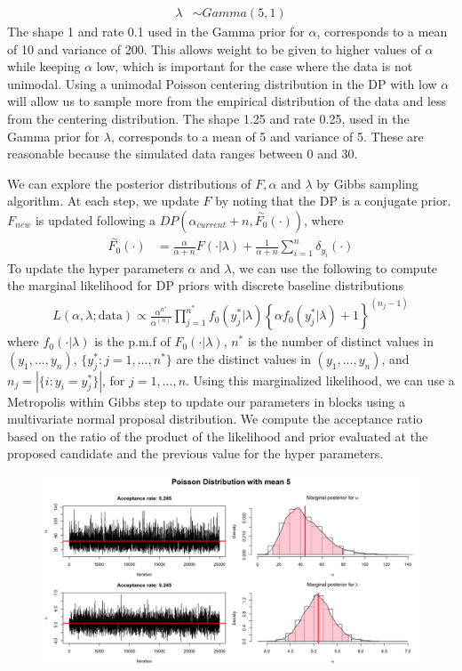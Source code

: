 \documentclass[a4paper, 10pt]{article}
\begin{document}
\begin{enumerate}
\begin{align*}
        \lambda &\sim Gamma(5, 1)
    \end{align*}
    The shape 1 and rate 0.1 used in the Gamma prior for $\alpha$, corresponds to a mean of 10 and variance of 200. This allows weight to be given to higher values of $\alpha$ while keeping $\alpha$ low, which is important for the case where the data is not unimodal. Using a unimodal Poisson centering distribution in the DP with low $\alpha$ will allow us to sample more from the empirical distribution of the data and less from the centering distribution. The shape 1.25 and rate 0.25, used in the Gamma prior for $\lambda$, corresponds to a mean of 5 and variance of 5. These are reasonable because the simulated data ranges between 0 and 30.
    
    We can explore the posterior distributions of $F, \alpha$ and $\lambda$ by Gibbs sampling algorithm. At each step, we update $F$ by noting that the DP is a conjugate prior. $F_{new}$ is updated following a $DP(\alpha_{current} + n, \stackrel{\sim}{F_0}(\cdot))$, where 
    \begin{align*}
        \stackrel{\sim}{F_0}(\cdot) &= \frac{\alpha}{\alpha + n} F(\cdot|\lambda) + \frac{1}{\alpha + n} \sum_{i=1}^n \delta_{y_i}(\cdot)
    \end{align*}
    To update the hyper parameters $\alpha$ and $\lambda$, we can use the following to compute the marginal likelihood for DP priors with discrete baseline distributions
    \begin{align*}
        L(\alpha, \lambda; \text{data}) \propto \frac{\alpha^{n^*}}{\alpha^{(n)}} \prod_{j = 1}^{n^*} f_0 (y_j^*|\lambda) \left\{ \alpha f_0(y_j^*|\lambda) + 1 \right\}^{(n_j -1)}
    \end{align*}
    where $f_0(\cdot|\lambda)$ is the p.m.f of $F_0(\cdot|\lambda)$, $n^*$ is the number of distinct values in $(y_1,...,y_n)$, $\{ y_j^*: j = 1,...,n^* \}$ are the distinct values in $(y_1,...,y_n)$, and $n_j = |\{ i: y_i = y_j^*\}|$, for $j=1,...,n$. Using this marginalized likelihood, we can use a Metropolis within Gibbs step to update our parameters in blocks using a multivariate normal proposal distribution. We compute the acceptance ratio based on the ratio of the product of the likelihood and prior evaluated at the proposed candidate and the previous value for the hyper parameters.
    \begin{figure}[h!]
        \centering
        \includegraphics[scale = 0.3]{2a_marginals.png}

\end{figure}
\end{enumerate}
\end{document}
